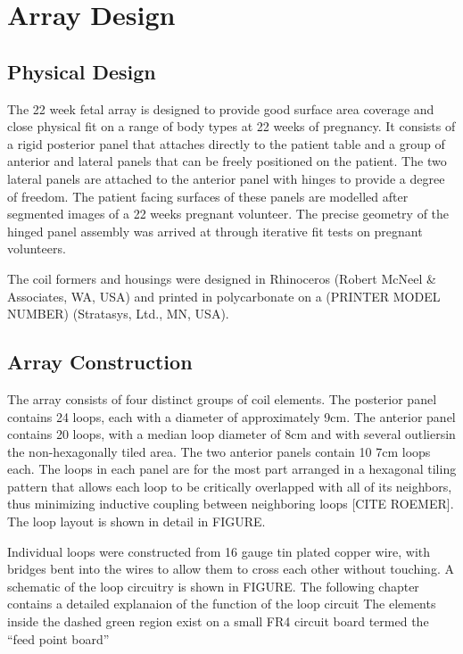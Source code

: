 \chapter{Array Design}
\section{Physical Design}
The 22 week fetal array is designed to provide good surface area coverage and close physical fit on a range of body
types at 22 weeks of pregnancy.  It consists of a rigid posterior panel that attaches directly to the patient table and
a group of anterior and lateral panels that can be freely positioned on the patient. The two lateral panels are attached
to the anterior panel with hinges to provide a degree of freedom. The patient facing surfaces of these panels are
modelled after segmented images of a 22 weeks pregnant volunteer. The precise geometry of the hinged panel assembly was
arrived at through iterative fit tests on pregnant volunteers.
  
The coil formers and housings were designed in Rhinoceros (Robert McNeel & Associates, WA, USA) and printed in
polycarbonate on a (PRINTER MODEL NUMBER) (Stratasys, Ltd., MN, USA).

\section{Array Construction}
The array consists of four distinct groups of coil elements. The posterior panel contains 24 loops, each with a diameter
of approximately 9cm. The anterior panel contains 20 loops, with a median loop diameter of 8cm and with several
outliersin the non-hexagonally tiled area. The two anterior panels contain 10 7cm loops each. The loops in each panel
are for the most part arranged in a hexagonal tiling pattern that allows each loop to be critically overlapped with all
of its neighbors,  thus minimizing inductive coupling between neighboring loops [CITE ROEMER]. The loop layout is shown
in detail in FIGURE.

Individual loops were constructed from 16 gauge tin plated copper wire, with bridges bent into the wires to allow them
to cross each other without touching. A schematic of the loop circuitry is shown in FIGURE. The following chapter
contains a detailed explanaion of the function of the loop circuit The elements inside the dashed green region exist on
a small FR4 circuit board termed the “feed point board” 

